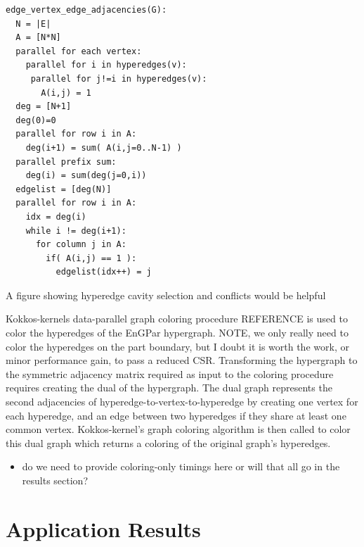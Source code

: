 \documentclass[graybox]{svmult}
\begin{document}
\begin{verbatim}
edge_vertex_edge_adjacencies(G):
  N = |E|
  A = [N*N]
  parallel for each vertex:
    parallel for i in hyperedges(v):
     parallel for j!=i in hyperedges(v):
       A(i,j) = 1
  deg = [N+1]
  deg(0)=0
  parallel for row i in A:
    deg(i+1) = sum( A(i,j=0..N-1) )
  parallel prefix sum:
    deg(i) = sum(deg(j=0,i))
  edgelist = [deg(N)]
  parallel for row i in A:
    idx = deg(i)
    while i != deg(i+1):
      for column j in A:
        if( A(i,j) == 1 ):
          edgelist(idx++) = j
\end{verbatim}


{\color{red}A figure showing hyperedge cavity selection and conflicts would be
helpful}

Kokkos-kernels data-parallel graph coloring procedure REFERENCE is used to
color the hyperedges of the EnGPar hypergraph.
{\color{red}NOTE, we only really need to color the hyperedges on the part boundary,
but I doubt it is worth the work, or minor performance gain, to pass a reduced CSR.}
Transforming the hypergraph to the symmetric adjacency matrix required as input
to the coloring procedure requires creating the dual of the hypergraph.
The dual graph represents the second adjacencies of
hyperedge-to-vertex-to-hyperedge by creating one vertex for each hyperedge, and
an edge between two hyperedges if they share at least one common vertex.
Kokkos-kernel's graph coloring algorithm is then called to color this dual graph
which returns a coloring of the original graph's hyperedges.

\begin{itemize}
  \item do we need to provide coloring-only timings here or will that all go in
    the results section?
\end{itemize}

\section{Application Results} \label{sec:results}
\end{document}
